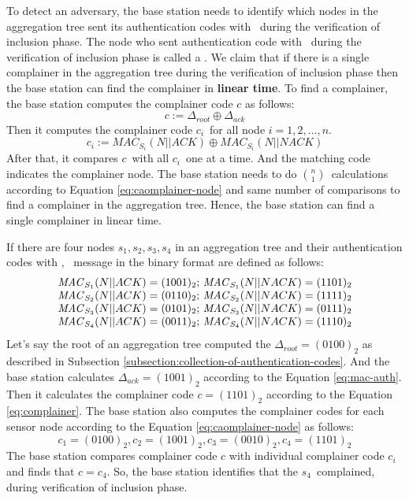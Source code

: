 		To detect an adversary, the base station needs to identify which nodes in the aggregation tree sent its authentication codes with \nack\ during the verification of inclusion phase.
		The node who sent authentication code with \nack\ during the verification of inclusion phase is called a \complainer. 
		We claim that if there is a single complainer in the aggregation tree during the verification of inclusion phase then the base station can find the complainer in \textbf{linear time}.
		To find a complainer, the base station computes the complainer code $c$ as follows:
		\begin{equation}
			\label{eq:complainer}
			c := \Delta_{root} \oplus \Delta_{ack}
		\end{equation}
		Then it computes the complainer code $c_{i}$\ for all node $i = 1, 2, \dotsc, n$. 
		\begin{equation}
			\label{eq:caomplainer-node}
			c_{i} := MAC_{S_{i}}(N || ACK) \oplus MAC_{S_{i}}(N || NACK)
		\end{equation}
		After that, it compares $c$\ with all $c_{i}$\ one at a time. 
		And the matching code indicates the complainer node.
		The base station needs to do $n \choose 1$\ calculations according to Equation \ref{eq:caomplainer-node} and same number of comparisons to find a complainer in the aggregation tree. 
		Hence, the base station can find a single complainer in linear time.
		\begin{exmp} 
			If there are four nodes ${s_{1},s_{2},s_{3},s_{4}}$ in an aggregation tree and their authentication codes with \ack, \nack\ message in the binary format are defined as follows:
			\begin{equation}
				\begin{array}{l}
					\mac_{S_{1}}(N || \ack) = (1001)_{2};\ \mac_{S_{1}}(N || \nack) = (1101)_{2}\\
					\mac_{S_{2}}(N || \ack) = (0110)_{2};\ \mac_{S_{2}}(N || \nack) = (1111)_{2}\\	
					\mac_{S_{3}}(N || \ack) = (0101)_{2};\ \mac_{S_{3}}(N || \nack) = (0111)_{2}\\
					\mac_{S_{4}}(N || \ack) = (0011)_{2};\ \mac_{S_{4}}(N || \nack) = (1110)_{2}
				\end{array}
			\end{equation}
			Let's say the root of an aggregation tree computed the $\Delta_{root} = (0100)_{2}$ as described in Subsection \ref{subsection:collection-of-authentication-codes}.
			And the base station calculates $\Delta_{ack} = (1001)_{2}$ according to the Equation \ref{eq:mac-auth}.
			Then it calculates the complainer code $c = (1101)_{2}$ according to the Equation \ref{eq:complainer}.
			The base station also computes the complainer codes for each sensor node according to the Equation \ref{eq:caomplainer-node} as follows:
			\begin{equation}			
				c_{1} = (0100)_{2}, c_{2} = (1001)_{2}, c_{3} = (0010)_{2}, c_{4} = (1101)_{2}
			\end{equation}
			The base station compares complainer code $c$ with individual complainer code $c_{i}$ and finds that $c=c_{4}$.
			So, the base station identifies that the $s_{4}$\ complained, during verification of inclusion phase.
		\end{exmp}
